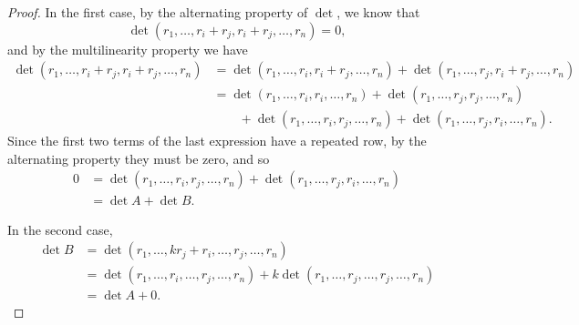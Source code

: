 \begin{proof}
    In the first case, by the alternating property of $\det$, we know that
    \[\det (r_1, \ldots, r_i + r_j, r_i + r_j, \ldots, r_n) = 0,\]
    and by the multilinearity property we have
    \begin{align*}
        \det (r_1, \ldots, r_i + r_j, r_i + r_j, \ldots, r_n) &= \det (r_1, \ldots, r_i, r_i + r_j, \ldots, r_n) + \det (r_1, \ldots, r_j, r_i + r_j, \ldots, r_n) \\
        &= \det (r_1, \ldots, r_i, r_i, \ldots, r_n) + \det (r_1, \ldots, r_j, r_j, \ldots, r_n)\\
        &\quad\quad + \det (r_1, \ldots, r_i, r_j, \ldots, r_n) + \det (r_1, \ldots, r_j, r_i, \ldots, r_n).
    \end{align*}
    Since the first two terms of the last expression have a repeated row, by the alternating property they must be zero, and so
    \begin{align*}
        0 &= \det (r_1, \ldots, r_i, r_j, \ldots, r_n) + \det (r_1, \ldots, r_j, r_i, \ldots, r_n) \\
        &= \det A + \det B.
    \end{align*}

    In the second case,
    \begin{align*}
        \det B &= \det\left(r_1, \ldots, kr_j + r_i, \ldots, r_j, \ldots, r_n\right) \\
        &= \det\left(r_1, \ldots, r_i, \ldots, r_j, \ldots, r_n\right) + k\det\left(r_1, \ldots, r_j, \ldots, r_j, \ldots, r_n\right) \\
        &= \det A + 0.
    \end{align*}
\end{proof}

